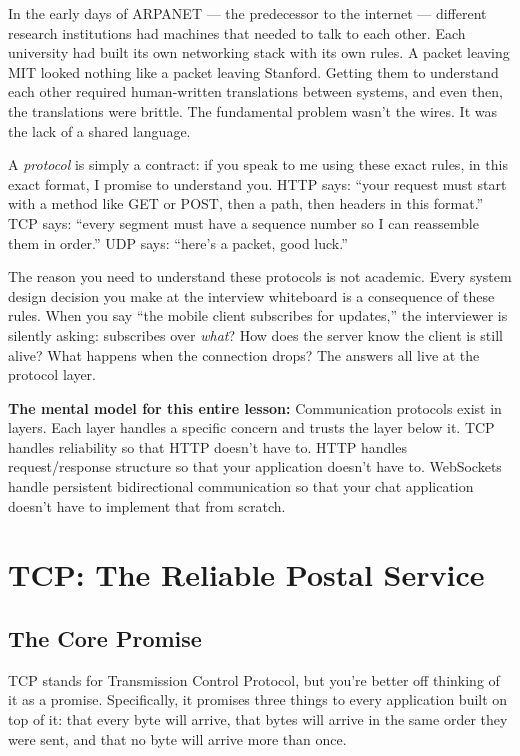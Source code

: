 \documentclass[11pt,a4paper]{article}
\begin{document}
In the early days of ARPANET --- the predecessor to the internet --- different research institutions had machines that needed to talk to each other. Each university had built its own networking stack with its own rules. A packet leaving MIT looked nothing like a packet leaving Stanford. Getting them to understand each other required human-written translations between systems, and even then, the translations were brittle. The fundamental problem wasn't the wires. It was the lack of a shared language.

A \emph{protocol} is simply a contract: if you speak to me using these exact rules, in this exact format, I promise to understand you. HTTP says: ``your request must start with a method like GET or POST, then a path, then headers in this format.'' TCP says: ``every segment must have a sequence number so I can reassemble them in order.'' UDP says: ``here's a packet, good luck.''

The reason you need to understand these protocols is not academic. Every system design decision you make at the interview whiteboard is a consequence of these rules. When you say ``the mobile client subscribes for updates,'' the interviewer is silently asking: subscribes over \emph{what}? How does the server know the client is still alive? What happens when the connection drops? The answers all live at the protocol layer.

\begin{insightbox}
\textbf{The mental model for this entire lesson:} Communication protocols exist in layers. Each layer handles a specific concern and trusts the layer below it. TCP handles reliability so that HTTP doesn't have to. HTTP handles request/response structure so that your application doesn't have to. WebSockets handle persistent bidirectional communication so that your chat application doesn't have to implement that from scratch.
\end{insightbox}

\section{TCP: The Reliable Postal Service}

\subsection{The Core Promise}

TCP stands for Transmission Control Protocol, but you're better off thinking of it as a promise. Specifically, it promises three things to every application built on top of it: that every byte will arrive, that bytes will arrive in the same order they were sent, and that no byte will arrive more than once.
\end{document}
